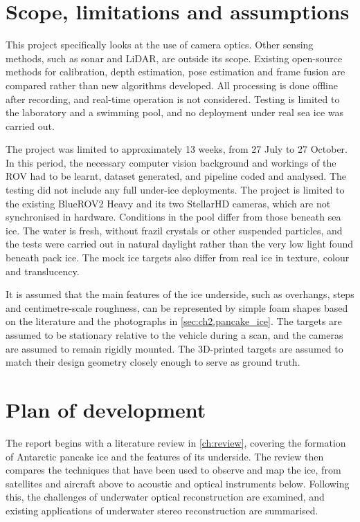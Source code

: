 \section{Scope, limitations and assumptions}
\label{sec:ch1.scope}

This project specifically looks at the use of camera optics. Other sensing methods, such as sonar and LiDAR, are outside its scope. Existing open-source methods for
calibration, depth estimation, pose estimation and frame fusion are compared rather than new algorithms developed.
All processing is done offline after recording, and real-time operation is not considered. Testing is limited to the
laboratory and a swimming pool, and no deployment under real sea ice was carried out.

The project was limited to approximately 13 weeks, from 27 July to
27 October. In this
period, the necessary computer vision background and workings of the ROV had to be learnt, dataset generated, and pipeline
coded and analysed. The testing did not include any full under-ice deployments.
The project is limited to the existing BlueROV2 Heavy and its two StellarHD cameras, which are not synchronised in
hardware. Conditions in the pool differ from those beneath sea ice. The water is fresh, without frazil
crystals or other suspended particles, and the tests were carried out in natural daylight rather than the very low
light found beneath pack ice. The mock ice targets also differ from real ice in texture, colour and translucency. 


It is assumed that the main features of the ice underside, such as overhangs, steps and centimetre-scale roughness,
can be represented by simple foam shapes based on the literature and the photographs in \autoref{sec:ch2.pancake_ice}.
The targets are assumed to be stationary relative to the vehicle during a scan, and the cameras are assumed to remain
rigidly mounted. The 3D-printed targets are assumed to match
their design geometry closely enough to serve as ground truth. %

\section{Plan of development}
\label{sec:ch1.planofdevelopment}
The report begins with a literature review in \autoref{ch:review}, covering the formation of Antarctic pancake ice and
the features of its underside. The review then compares the techniques that have been used to observe and map the ice, from satellites and
aircraft above to acoustic and optical instruments below. Following this, the challenges of underwater optical
reconstruction are examined, and existing applications of underwater stereo reconstruction are summarised.

